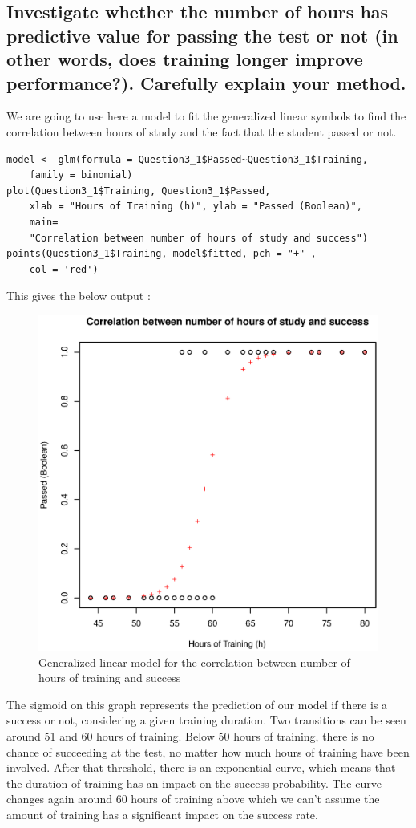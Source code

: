 \documentclass[12pt,a4paper]{scrartcl}
\begin{document}
\subsection{Investigate whether the number of hours has predictive value for passing the test or not (in other words, does training longer improve performance?). Carefully explain your method.}
We are going to use here a model to fit the generalized linear symbols to find the correlation between hours of study and the fact that the student passed or not.
\begin{lstlisting}[frame=single]
model <- glm(formula = Question3_1$Passed~Question3_1$Training,
    family = binomial)
plot(Question3_1$Training, Question3_1$Passed, 
    xlab = "Hours of Training (h)", ylab = "Passed (Boolean)", 
    main= 
    "Correlation between number of hours of study and success")
points(Question3_1$Training, model$fitted, pch = "+" , 
    col = 'red')
\end{lstlisting}
This gives the below output :
\begin{figure}[H]
\includegraphics[scale=0.7]{model.eps}
\centering
\caption{Generalized linear model for the correlation between number of hours of training and success}
\end{figure}

The sigmoid on this graph represents the prediction of our model if there is a success or not, considering a given training duration. Two transitions can be seen around 51 and 60 hours of training. Below 50 hours of training, there is no chance of succeeding at the test, no matter how much hours of training have been involved. After that threshold, there is an exponential curve, which means that the duration of training has an impact on the success probability. The curve changes again around 60 hours of training above which we can't assume the amount of training has a significant impact on the success rate.
\end{document}
